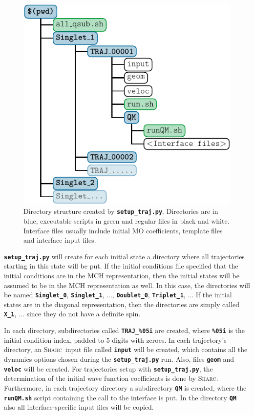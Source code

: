 \documentclass[a4paper,10pt,DIV=15,openany,twoside=false]{scrbook}
\newcommand{\sharc}{\textsc{Sharc}}
\newcommand{\ttt}[1]{\textbf{\texttt{#1}}}
\begin{document}
\begin{figure}
  \centering
  \includegraphics[scale=1]{img/dirs_traj/dirs_traj.pdf}
  \caption{Directory structure created by \ttt{setup\_traj.py}. Directories are in blue, executable scripts in green and regular files in black and white. Interface files usually include initial MO coefficients, template files and interface input files.}
  \label{fig:dirs_traj}
\end{figure}

\ttt{setup\_traj.py} will create for each initial state a directory where all trajectories starting in this state will be put. If the initial conditions file specified that the initial conditions are in the MCH representation, then the initial states will be assumed to be in the MCH representation as well. In this case, the directories will be named \ttt{Singlet\_0}, \ttt{Singlet\_1}, ..., \ttt{Doublet\_0}, \ttt{Triplet\_1}, ... If the initial states are in the diagonal representation, then the directories are simply called \ttt{X\_1}, ... since they do not have a definite spin.

In each directory, subdirectories called \ttt{TRAJ\_\%05i} are created, where \ttt{\%05i} is the initial condition index, padded to 5 digits with zeroes. In each trajectory's directory, an \sharc\ input file called \ttt{input} will be created, which contains all the dynamics options chosen during the \ttt{setup\_traj.py} run. Also, files \ttt{geom} and \ttt{veloc} will be created. For trajectories setup with \ttt{setup\_traj.py}, the determination of the initial wave function coefficients is done by \sharc.
Furthermore, in each trajectory directory a subdirectory \ttt{QM} is created, where the \ttt{runQM.sh} script containing the call to the interface is put. In the directory \ttt{QM} also all interface-specific input files will be copied.
\end{document}
